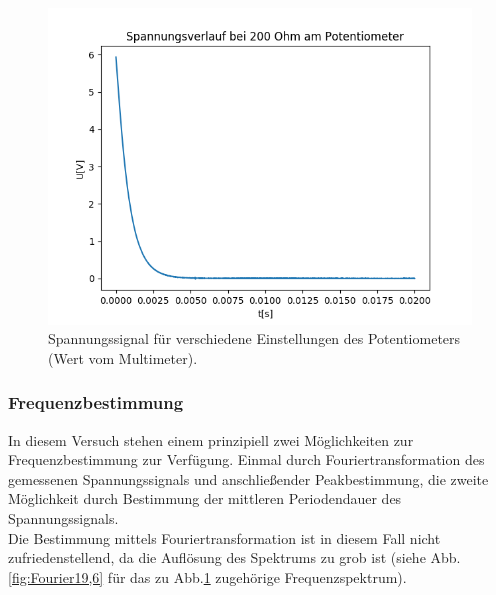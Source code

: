 \documentclass[12pt,a4paper]{article}
\begin{document}
\begin{figure}
\begin{center}
\includegraphics[scale=0.5]{Bilder/Spannungsverlauf200}
\end{center}
\caption[Spannungsverlauf]{Spannungssignal für verschiedene Einstellungen des Potentiometers (Wert vom Multimeter).}
\label{fig:Spannung19,6}
\end{figure}



\subsubsection{Frequenzbestimmung}
In diesem Versuch stehen einem prinzipiell zwei Möglichkeiten zur Frequenzbestimmung zur Verfügung.
Einmal durch Fouriertransformation des gemessenen Spannungssignals und anschließender Peakbestimmung, die zweite Möglichkeit durch Bestimmung der mittleren Periodendauer des Spannungssignals.\\

Die Bestimmung mittels Fouriertransformation ist in diesem Fall nicht zufriedenstellend, da die Auflösung des Spektrums zu grob ist (siehe Abb.\ref{fig:Fourier19,6} für das zu Abb.\ref{fig:Spannung19,6} zugehörige Frequenzspektrum).\\
\end{document}
